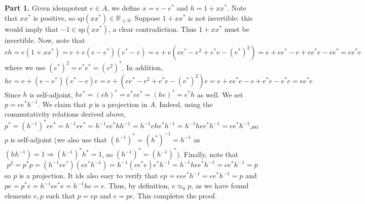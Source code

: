 \documentclass[aps,pra,showpacs,notitlepage,onecolumn,superscriptaddress,nofootinbib]{revtex4-1}
\theoremstyle{definition}
\begin{document}
\noindent \textbf{Part 1.} Given idempotent $e \in A$, we define $x = e - e^{*}$ and $h = 1 + x x^{*}$. Note that $x x^{*}$ is positive, so $\text{sp}(x x^{*}) \in \mathbb{R}_{\geq 0}$. Suppose $1 + x x^{*}$ is not invertible: this would imply that
$-1 \in \text{sp}(x x^{*})$, a clear contradiction. Thus $1 + x x^{*}$ must be invertible. Now, note that
\begin{equation}
  eh = e(1 + x x^{*}) = e + e (e - e^{*})(e^{*} - e) = e + e (e e^{*} - e^2 + e^{*} e - (e^{*})^2) = e + e e^{*} - e + e e^{*} e - e e^{*} = e e^{*} e
\end{equation}
where we use $(e^{*})^2 = e^{*} e^{*} = (e^2)^{*}$. In addition,
\begin{equation}
  h e = e + (e - e^{*})(e^{*} - e) e = e + (e e^{*} - e^2 + e^{*} e - (e^{*})^2) e = e + e e^{*} e - e + e^{*} e - e^{*} e = e e^{*} e
\end{equation}
Since $h$ is self-adjoint, $h e^{*} = (eh)^{*} = e^{*} e e^{*} = (he)^{*} = e^{*} h$ as well. We set $p = e e^{*} h^{-1}$. We claim that $p$ is a projection in $A$. Indeed,
using the commutativity relations derived above,
$p^{*} = (h^{-1})^{*} e e^{*} = h^{-1} e e^{*} = h^{-1} e e^{*} h h^{-1} = h^{-1} e h e^{*} h^{-1} = h^{-1} h e e^{*} h^{-1} = e e^{*} h^{-1}$,so $p$ is self-adjoint (we
also use that $(h^{-1})^{*} = (h^{*})^{-1} = h^{-1}$ as $( h h^{-1}) = 1 \Rightarrow (h^{-1})^{*} h^{*} = 1$, so $(h^{-1})^{*} = (h^{-1})^{*}$). Finally, note that
\begin{equation}
  p^2 = p^{*} p = (h^{-1} e e^{*}) (e e^{*} h^{-1}) = h^{-1} (e e^{*} e) e^{*} h^{-1} = h^{-1} h e e^{*} h^{-1} = e e^{*} h^{-1} = p
\end{equation}
so $p$ is a projection. It ids also easy to verify that $ep = e e e^{*} h^{-1} = e e^{*} h^{-1} = p$ and $pe = p^{*} e = h^{-1} e e^{*} e = h^{-1} h e = e$.
Thus, by definition, $e \approx_0 p$, as we have found elements $e, p$ such that $p = ep$ and $e = pe$. This completes the proof.
\newline
\end{document}
